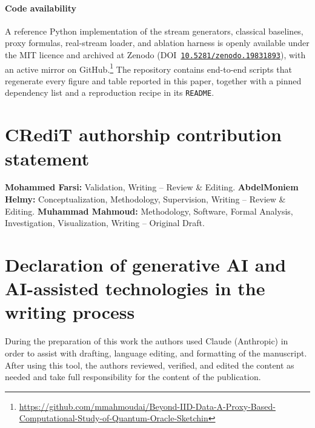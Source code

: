 \documentclass[preprint,12pt,authoryear]{elsarticle}
\begin{document}
\paragraph{Code availability} A reference Python implementation of the stream generators, classical baselines, proxy formulas, real-stream loader, and ablation harness is openly available under the MIT licence and archived at Zenodo (DOI~\href{https://doi.org/10.5281/zenodo.19831893}{\texttt{10.5281/zenodo.19831893}}), with an active mirror on GitHub.\footnote{\url{https://github.com/mmahmoudai/Beyond-IID-Data-A-Proxy-Based-Computational-Study-of-Quantum-Oracle-Sketchin}} The repository contains end-to-end scripts that regenerate every figure and table reported in this paper, together with a pinned dependency list and a reproduction recipe in its \texttt{README}.

\section*{CRediT authorship contribution statement}
\textbf{Mohammed Farsi:} Validation, Writing -- Review \& Editing. \textbf{AbdelMoniem Helmy:} Conceptualization, Methodology, Supervision, Writing -- Review \& Editing. \textbf{Muhammad Mahmoud:} Methodology, Software, Formal Analysis, Investigation, Visualization, Writing -- Original Draft.

\section*{Declaration of generative AI and AI-assisted technologies in the writing process}
During the preparation of this work the authors used Claude (Anthropic) in order to assist with drafting, language editing, and formatting of the manuscript. After using this tool, the authors reviewed, verified, and edited the content as needed and take full responsibility for the content of the publication.


\end{document}
